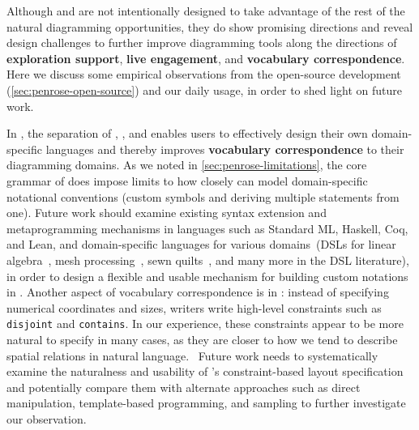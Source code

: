 Although \Penrose and \Edgeworth are not intentionally designed to take advantage of the rest of the natural diagramming opportunities, they do show promising directions and reveal design challenges to further improve diagramming tools along the directions of \textbf{exploration support}, \textbf{live engagement}, and \textbf{vocabulary correspondence}. Here we discuss some empirical observations from the open-source development (\cref{sec:penrose-open-source}) and our daily usage, in order to shed light on future work. 

In \Penrose, the separation of \Substance, \Style, and \Domain enables users to effectively design their own domain-specific languages and thereby improves \textbf{vocabulary correspondence} to their diagramming domains. As we noted in \cref{sec:penrose-limitations}, the core grammar of \Substance does impose limits to how closely \Substance can model domain-specific notational conventions (\eg custom symbols and deriving multiple statements from one). Future work should examine existing syntax extension and metaprogramming mechanisms in languages such as Standard ML, Haskell, Coq, and Lean, and domain-specific languages for various domains~(\eg DSLs for linear algebra~\cite{li_i_2021}, mesh processing~\cite{li_imesh_2024}, sewn quilts~\cite{clark_homotopy_2023}, and many more in the DSL literature), in order to design a flexible and usable mechanism for building custom notations in \Penrose. Another aspect of vocabulary correspondence is in \Style: instead of specifying numerical coordinates and sizes, \Style writers write high-level constraints such as \texttt{disjoint} and \texttt{contains}. In our experience, these constraints appear to be more natural to specify in many cases, as they are closer to how we tend to describe spatial relations in natural language.~\cite{pan_human-computer_2023} Future work needs to systematically examine the naturalness and usability of \Style's constraint-based layout specification and potentially compare them with alternate approaches such as direct manipulation, template-based programming, and sampling to further investigate our observation.

